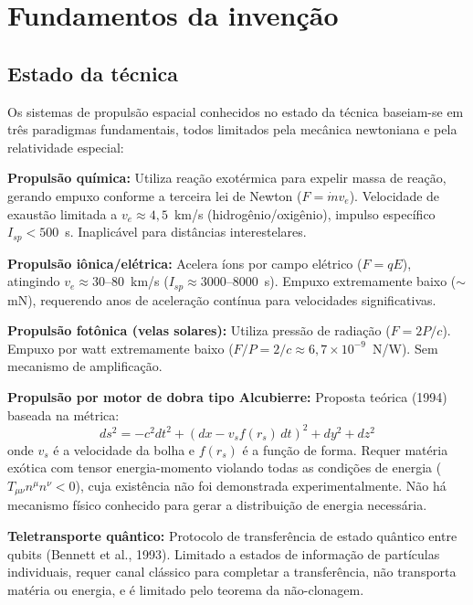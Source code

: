 \documentclass[12pt,a4paper]{article}
\begin{document}
\newpage
\section{Fundamentos da invenção}

\subsection{Estado da técnica}

Os sistemas de propulsão espacial conhecidos no estado da técnica
baseiam-se em três paradigmas fundamentais, todos limitados pela
mecânica newtoniana e pela relatividade especial:

\textbf{Propulsão química:} Utiliza reação exotérmica para
expelir massa de reação, gerando empuxo conforme a terceira lei
de Newton ($F = \dot{m} v_e$). Velocidade de exaustão limitada a
$v_e \approx 4{,}5$~km/s (hidrogênio/oxigênio), impulso
específico $I_{sp} < 500$~s. Inaplicável para distâncias
interestelares.

\textbf{Propulsão iônica/elétrica:} Acelera íons por campo
elétrico ($F = qE$), atingindo $v_e \approx 30$--$80$~km/s
($I_{sp} \approx 3000$--$8000$~s). Empuxo extremamente baixo
($\sim$mN), requerendo anos de aceleração contínua para
velocidades significativas.

\textbf{Propulsão fotônica (velas solares):} Utiliza pressão de
radiação ($F = 2P/c$). Empuxo por watt extremamente baixo
($F/P = 2/c \approx 6{,}7 \times 10^{-9}$~N/W). Sem mecanismo
de amplificação.

\textbf{Propulsão por motor de dobra tipo Alcubierre:} Proposta
teórica (1994) baseada na métrica:
\begin{equation}
ds^2 = -c^2 dt^2 + (dx - v_s f(r_s)\, dt)^2 + dy^2 + dz^2
\end{equation}
onde $v_s$ é a velocidade da bolha e $f(r_s)$ é a função de
forma. Requer matéria exótica com tensor energia-momento
violando todas as condições de energia ($T_{\mu\nu} n^\mu n^\nu
< 0$), cuja existência não foi demonstrada experimentalmente.
Não há mecanismo físico conhecido para gerar a distribuição de
energia necessária.

\textbf{Teletransporte quântico:} Protocolo de transferência de
estado quântico entre qubits (Bennett et al., 1993). Limitado
a estados de informação de partículas individuais, requer canal
clássico para completar a transferência, não transporta matéria
ou energia, e é limitado pelo teorema da não-clonagem.
\end{document}
